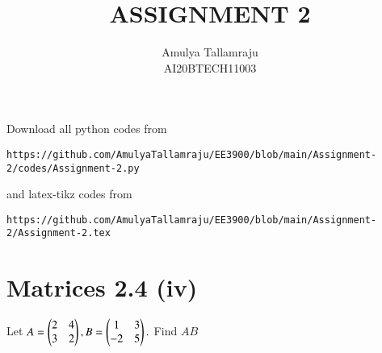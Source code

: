 \documentclass[journal,12pt,twocolumn]{IEEEtran}
\begin{document}
     \def\centbox#1{\makebox[0in]{#1}}
     \def\topbox#1{\raisebox{-\baselineskip}[0in][0in]{#1}}
     \def\midbox#1{\raisebox{-0.5\baselineskip}[0in][0in]{#1}}
\vspace{3cm}
\title{ASSIGNMENT 2}
\author{Amulya Tallamraju \\ AI20BTECH11003}
\maketitle
\newpage
\bigskip
\renewcommand{\thefigure}{\theenumi}
\renewcommand{\thetable}{\theenumi}
Download all python codes from 
\begin{lstlisting}
https://github.com/AmulyaTallamraju/EE3900/blob/main/Assignment-2/codes/Assignment-2.py
\end{lstlisting}
%
and latex-tikz codes from 
%
\begin{lstlisting}
https://github.com/AmulyaTallamraju/EE3900/blob/main/Assignment-2/Assignment-2.tex
\end{lstlisting}
%
\section{Matrices 2.4 (iv)}
Let $A=\begin{pmatrix}2 &4\\3 &2\end{pmatrix},B=\begin{pmatrix}1 &3\\-2 &5\end{pmatrix}.$
Find $AB$
%
\end{document}
